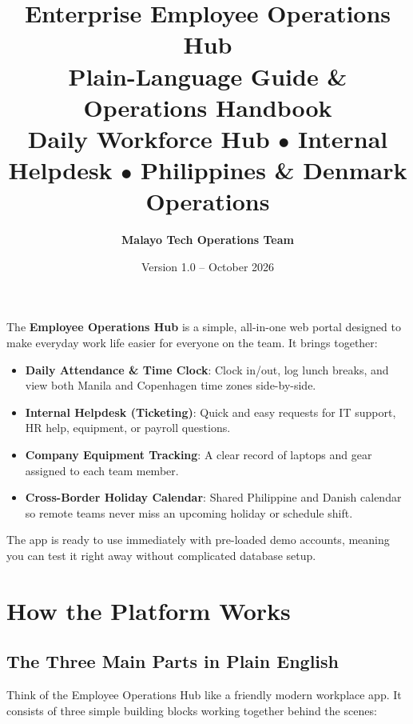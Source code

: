 \documentclass[a4paper,11pt]{article}
\title{
  \vspace{-1.5cm}
  {\LARGE\textbf{\textcolor{branddark}{Enterprise Employee Operations Hub}}}\\[0.4cm]
  {\large\textbf{\textcolor{brandblue}{Plain-Language Guide \& Operations Handbook}}}\\[0.3cm]
  {\small\textcolor{brandgray}{Daily Workforce Hub $\bullet$ Internal Helpdesk $\bullet$ Philippines \& Denmark Operations}}
}
\author{\textbf{Malayo Tech Operations Team}}
\date{Version 1.0 -- October 2026}
\begin{document}
\maketitle
\thispagestyle{empty}

\vspace{-0.4cm}
\begin{center}
\begin{minipage}{0.96\textwidth}
\begin{infobox}
The \textbf{Employee Operations Hub} is a simple, all-in-one web portal designed to make everyday work life easier for everyone on the team. It brings together:
\begin{itemize}[leftmargin=1.5em]
    \item \textbf{Daily Attendance \& Time Clock}: Clock in/out, log lunch breaks, and view both Manila and Copenhagen time zones side-by-side.
    \item \textbf{Internal Helpdesk (Ticketing)}: Quick and easy requests for IT support, HR help, equipment, or payroll questions.
    \item \textbf{Company Equipment Tracking}: A clear record of laptops and gear assigned to each team member.
    \item \textbf{Cross-Border Holiday Calendar}: Shared Philippine and Danish calendar so remote teams never miss an upcoming holiday or schedule shift.
\end{itemize}
The app is ready to use immediately with pre-loaded demo accounts, meaning you can test it right away without complicated database setup.
\end{infobox}
\end{minipage}
\end{center}

\vspace{0.2cm}
\tableofcontents
\newpage

\section{How the Platform Works}

\subsection{The Three Main Parts in Plain English}
Think of the Employee Operations Hub like a friendly modern workplace app. It consists of three simple building blocks working together behind the scenes:
\end{document}
